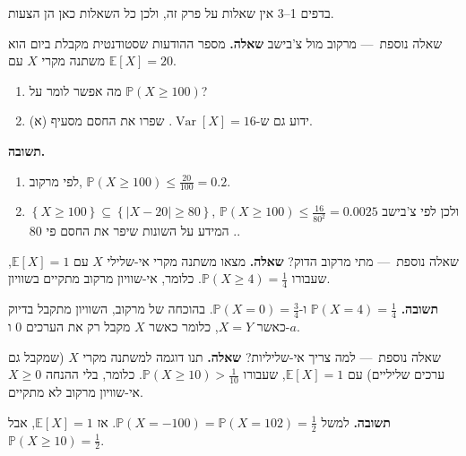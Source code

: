 \documentclass[11pt,a4paper]{report}
\newcommand{\set}[1]{\left\{#1\right\}}
\newcommand{\PP}{\mathbb{P}}
\newcommand{\E}{\mathbb{E}}
\DeclareMathOperator{\Var}{Var}
\newcommand{\dash}{{\rmfamily —}}
\begin{document}
בדפים 1--3 אין שאלות על פרק זה, ולכן כל השאלות כאן הן הצעות.

\begin{suggestion}{שאלה נוספת~\dash{} מרקוב מול צ'בישב}
\textbf{שאלה.} מספר ההודעות שסטודנטית מקבלת ביום הוא משתנה מקרי $X$ עם $\E[X]=20$.
\begin{enumerate}[label=(\alph*),itemsep=1pt,topsep=2pt]
  \item מה אפשר לומר על $\PP(X\ge100)$?
  \item ידוע גם ש-$\Var[X]=16$. שפרו את החסם מסעיף (א).
\end{enumerate}

\textbf{תשובה.}
\begin{enumerate}[label=(\alph*),itemsep=1pt,topsep=2pt]
  \item לפי מרקוב, $\PP(X\ge100)\le\frac{20}{100}=0.2$.
  \item $\set{X\ge100}\subseteq\set{|X-20|\ge80}$, ולכן לפי צ'בישב $\PP(X\ge100)\le\frac{16}{80^2}=0.0025$. המידע על השונות שיפר את החסם פי 80.
\end{enumerate}
\end{suggestion}

\begin{suggestion}{שאלה נוספת~\dash{} מתי מרקוב הדוק?}
\textbf{שאלה.} מצאו משתנה מקרי אי-שלילי $X$ עם $\E[X]=1$, שעבורו $\PP(X\ge4)=\frac14$. כלומר, אי-שוויון מרקוב מתקיים בשוויון.

\textbf{תשובה.} $\PP(X=4)=\frac14$ ו-$\PP(X=0)=\frac34$. בהוכחה של מרקוב, השוויון מתקבל בדיוק כאשר $X=Y$, כלומר כאשר $X$ מקבל רק את הערכים $0$ ו-$a$.
\end{suggestion}

\begin{suggestion}{שאלה נוספת~\dash{} למה צריך אי-שליליות?}
\textbf{שאלה.} תנו דוגמה למשתנה מקרי $X$ (שמקבל גם ערכים שליליים) עם $\E[X]=1$, שעבורו $\PP(X\ge10)>\frac1{10}$. כלומר, בלי ההנחה $X\ge0$ אי-שוויון מרקוב לא מתקיים.

\textbf{תשובה.} למשל $\PP(X=-100)=\PP(X=102)=\frac12$. אז $\E[X]=1$, אבל $\PP(X\ge10)=\frac12$.
\end{suggestion}
\end{document}
